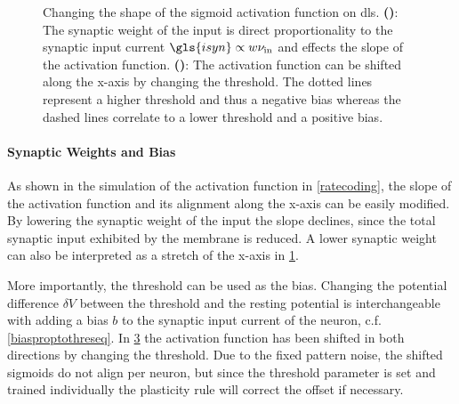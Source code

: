 \begin{figure}[tb!]
	\begin{subfigure}[c]{0.5\textwidth}
		\centering
		\caption{}
		
		\label{dlsactivationfunctionweight}
	\end{subfigure}	
	\begin{subfigure}[c]{0.5\textwidth}
		\centering
		\caption{}
		
		\label{dlsactivationfunctionbias}
	\end{subfigure}
	\caption[Changing the shape of the sigmoid activation function on \gls{dls}.]{Changing the shape of the sigmoid activation function on \gls{dls}. \textbf{()}: The synaptic weight of the input is direct proportionality to the synaptic input current $\gls{isyn} \propto w \nu_\text{in}$ and effects the slope of the activation function. \textbf{()}: The activation function can be shifted along the x-axis by changing the threshold. The dotted lines represent a higher threshold and thus a negative bias whereas the dashed lines correlate to a lower threshold and a positive bias.}
\end{figure}

\paragraph{Synaptic Weights and Bias} As shown in the simulation of the activation function in \cref{ratecoding}, the slope of the activation function and its alignment along the x-axis can be easily modified. By lowering the synaptic weight of the input the slope declines, since the total synaptic input exhibited by the membrane is reduced. A lower synaptic weight can also be interpreted as a stretch of the x-axis in \cref{dlsactivationfunctionweight}.

More importantly, the threshold can be used as the bias. Changing the potential difference $\delta V$ between the threshold and the resting potential is interchangeable with adding a bias $b$ to the synaptic input current of the neuron, c.f. \cref{biasproptothreseq}. In \cref{dlsactivationfunctionbias} the activation function has been shifted in both directions by changing the threshold. Due to the fixed pattern noise, the shifted sigmoids do not align per neuron, but since the threshold parameter is set and trained individually the plasticity rule will correct the offset if necessary.



